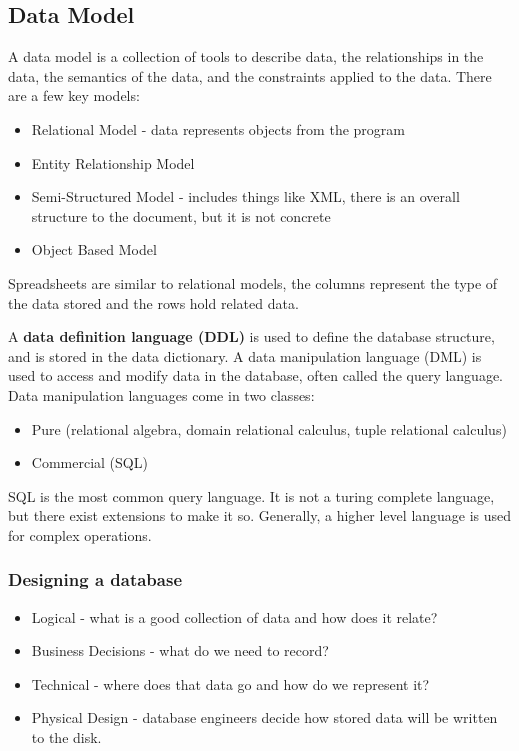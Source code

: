 \documentclass{math}
\begin{document}
\subsection*{Data Model}
A data model is a collection of tools to describe data, the relationships in the
data, the semantics of the data, and the constraints applied to the data. There
are a few key models:
\begin{itemize}
  \item Relational Model - data represents objects from the program
  \item Entity Relationship Model
  \item Semi-Structured Model - includes things like XML, there is an overall
    structure to the document, but it is not concrete
  \item Object Based Model
\end{itemize}
Spreadsheets are similar to relational models, the columns represent the type
of the data stored and the rows hold related data. \par
A \textbf{data definition language (DDL)} is used to define the database
structure, and is stored in the data dictionary. A data manipulation language
(DML) is used to access and modify data in the database, often called the query
language. Data manipulation languages come in two classes:
\begin{itemize}
  \item Pure (relational algebra, domain relational calculus, tuple relational
    calculus)
  \item Commercial (SQL)
\end{itemize}
SQL is the most common query language. It is not a turing complete language, but
there exist extensions to make it so. Generally, a higher level language is used
for complex operations.

\subsubsection*{Designing a database}
\begin{itemize}
  \item Logical - what is a good collection of data and how does it relate?
  \item Business Decisions - what do we need to record?
  \item Technical - where does that data go and how do we represent it?
  \item Physical Design - database engineers decide how stored data will be
    written to the disk.
\end{itemize}
\end{document}
